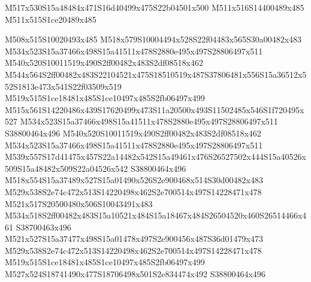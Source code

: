 \documentclass{article}
\begin{document}
\begin{multicols}{2}












\begin{center}
M517x530S15a48484x471S16d40499x475S22b04501x500 M511x516S14400489x485 M511x515S1ce20489x485 
\end{center}


M508x515S10020493x485 M518x579S10004494x528S22f04483x565S30a00482x483 M534x523S15a37466x498S15a41511x478S2880e495x497S28806497x511 M540x520S10011519x490S2ff00482x483S2df08518x462 M544x564S2ff00482x483S22104521x475S18510519x487S37806481x556S15a36512x552S1813e473x541S22f03509x519 M519x515S1ce18481x485S1ce10497x485S2fb06497x499 M515x561S14220486x439S17620499x473S11a20500x493S11502485x546S1f720495x527 M534x523S15a37466x498S15a41511x478S2880e495x497S28806497x511 S38800464x496 M540x520S10011519x490S2ff00482x483S2df08518x462 M534x523S15a37466x498S15a41511x478S2880e495x497S28806497x511 M539x557S17d41475x457S22a14482x542S15a49461x476S26527502x444S15a40526x509S15a48482x509S22a04526x542 S38800464x496 M518x554S15a37489x527S15a01490x526S2e900468x514S30d00482x483 M529x538S2e74c472x513S14220498x462S2e700514x497S14228471x478 M521x517S20500480x506S10043491x483 M534x518S2ff00482x483S15a10521x484S15a18467x484S26504520x460S26514466x461 S38700463x496 M521x527S15a37477x498S15a01478x497S2e900456x487S36d01479x473 M529x538S2e74c472x513S14220498x462S2e700514x497S14228471x478 M519x515S1ce18481x485S1ce10497x485S2fb06497x499 M527x524S18741490x477S18706498x501S2e834474x492 S38800464x496


\end{multicols}
\end{document}

